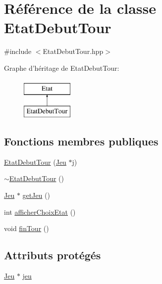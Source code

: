\hypertarget{class_etat_debut_tour}{\section{Référence de la classe Etat\-Debut\-Tour}
\label{class_etat_debut_tour}
}


{\ttfamily \#include $<$Etat\-Debut\-Tour.\-hpp$>$}

Graphe d'héritage de Etat\-Debut\-Tour\-:\begin{figure}[H]
\begin{center}
\leavevmode
\includegraphics[height=2.000000cm]{class_etat_debut_tour}
\end{center}
\end{figure}
\subsection*{Fonctions membres publiques}
\begin{DoxyCompactItemize}
\item 
\hyperlink{class_etat_debut_tour_aa5b6ac2f696939c38ef726489c518975}{Etat\-Debut\-Tour} (\hyperlink{class_jeu}{Jeu} $\ast$j)
\item 
\hyperlink{class_etat_debut_tour_a615b6f4808730d92f52d9d1aa93a706d}{$\sim$\-Etat\-Debut\-Tour} ()
\item 
\hyperlink{class_jeu}{Jeu} $\ast$ \hyperlink{class_etat_debut_tour_a764bfcd224a4f306682d352a74f4cea8}{get\-Jeu} ()
\item 
int \hyperlink{class_etat_debut_tour_a603db223f7f5f4c76fd6b978b54f33ae}{afficher\-Choix\-Etat} ()
\item 
void \hyperlink{class_etat_debut_tour_a0929f3701b5a1cda1e86aed3d2b40542}{fin\-Tour} ()
\end{DoxyCompactItemize}
\subsection*{Attributs protégés}
\begin{DoxyCompactItemize}
\item 
\hyperlink{class_jeu}{Jeu} $\ast$ \hyperlink{class_etat_debut_tour_a0a54a446667e7868dc4a88efff67055d}{jeu}
\end{DoxyCompactItemize}


